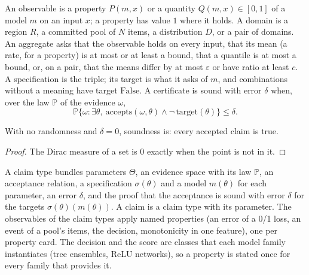 \begin{definition}\label{def:spec}
\leanok
An observable is a property $P(m, x)$ or a quantity $Q(m, x) \in [0, 1]$ of a model $m$ on an input
$x$; a property has value $1$ where it holds. A domain is a region $R$, a committed pool of $N$
items, a distribution $D$, or a pair of domains. An aggregate asks that the observable holds on
every input, that its mean (a rate, for a property) is at most or at least a bound, that a quantile
is at most a bound, or, on a pair, that the means differ by at most $\varepsilon$ or have ratio at
least $c$. A specification is the triple; its target is what it asks of $m$, and combinations
without a meaning have target $\mathrm{False}$. A certificate is sound with error $\delta$ when,
over the law $\mathbb{P}$ of the evidence $\omega$,
\[
  \mathbb{P}\{\omega : \exists \theta,\ \mathrm{accepts}(\omega, \theta) \wedge \neg\,\mathrm{target}(\theta)\} \le \delta .
\]
\end{definition}

\begin{theorem}\label{thm:sound_exact}
\leanok
{}
With no randomness and $\delta = 0$, soundness is: every accepted claim is true.
\end{theorem}
\begin{proof}
\leanok
The Dirac measure of a set is $0$ exactly when the point is not in it.
\end{proof}

\begin{definition}\label{def:claim_type}
\leanok
{}
A claim type bundles parameters $\Theta$, an evidence space with its law $\mathbb P$, an acceptance
relation, a specification $\sigma(\theta)$ and a model $m(\theta)$ for each parameter, an error
$\delta$, and the proof that the acceptance is sound with error $\delta$ for the targets
$\sigma(\theta)(m(\theta))$. A claim is a claim type with its parameter. The observables of the
claim types apply named properties (an error of a 0/1 loss, an event of a pool's items, the
decision, monotonicity in one feature), one per property card. The decision and the score are
classes that each model family instantiates (tree ensembles, ReLU networks), so a property is
stated once for every family that provides it.
\end{definition}

